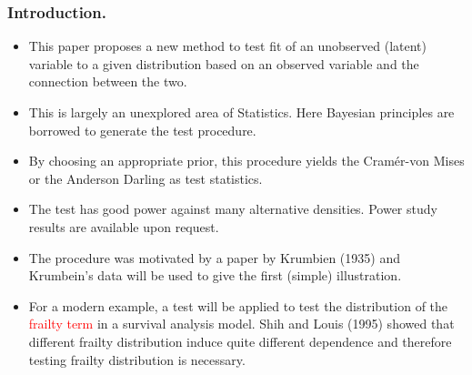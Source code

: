 \documentclass{beamer}
\newcommand{\cram}{Cram\'{e}r-von Mises }
\begin{document}
\frame
{
  \frametitle{Introduction.}

\begin{itemize}
\item
This paper proposes a new method to test fit of an unobserved (latent) variable 
to a given distribution based on an observed variable and the connection between the two. 
\item
This is largely an unexplored area of Statistics. Here Bayesian 
principles are borrowed to generate the test procedure. 
\item
By choosing an appropriate prior, this procedure yields the \cram 
 or the Anderson Darling  as test statistics. 

\item 
The test has good power against many alternative                                    
densities. Power study results are available upon request.

\item
The procedure was motivated by a paper by Krumbien (1935) and Krumbein's data will be used to give the first (simple) illustration. 

\item 
For a modern example, a test will be applied to test the distribution of the \textcolor{red} {frailty term}
 in a survival analysis  model. Shih and Louis (1995) showed that different frailty distribution induce quite different dependence and therefore 
testing frailty distribution is necessary.
  
 
\end{itemize} 

}
\end{document}
